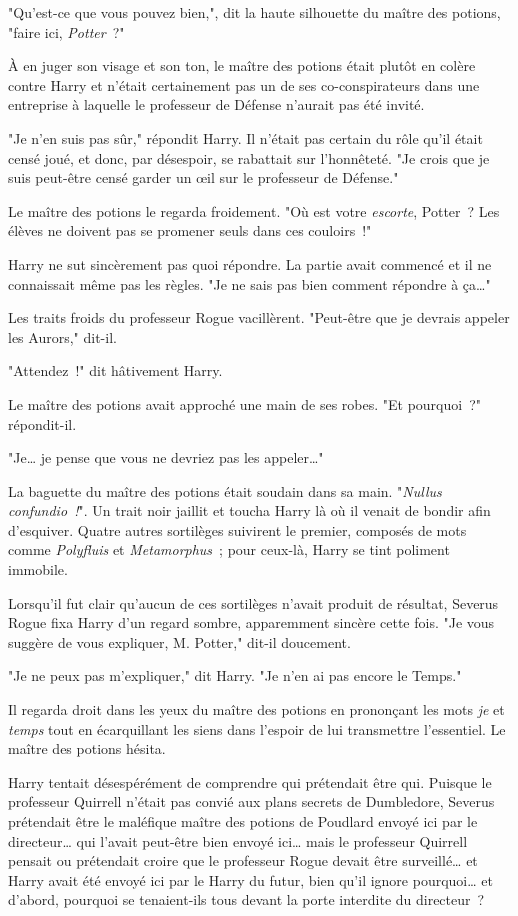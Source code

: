 "Qu'est-ce que vous pouvez bien,", dit la haute silhouette du maître des potions, "faire ici, \emph{Potter}~?"

À en juger son visage et son ton, le maître des potions était plutôt en colère contre Harry et n'était certainement pas un de ses co-conspirateurs dans une entreprise à laquelle le professeur de Défense n'aurait pas été invité.

"Je n'en suis pas sûr," répondit Harry. Il n'était pas certain du rôle qu'il était censé joué, et donc, par désespoir, se rabattait sur l'honnêteté. "Je crois que je suis peut-être censé garder un œil sur le professeur de Défense."

Le maître des potions le regarda froidement. "Où est votre \emph{escorte}, Potter~? Les élèves ne doivent pas se promener seuls dans ces couloirs~!"

Harry ne sut sincèrement pas quoi répondre. La partie avait commencé et il ne connaissait même pas les règles. "Je ne sais pas bien comment répondre à ça…"

Les traits froids du professeur Rogue vacillèrent. "Peut-être que je devrais appeler les Aurors," dit-il.

"Attendez~!" dit hâtivement Harry.

Le maître des potions avait approché une main de ses robes. "Et pourquoi~?" répondit-il.

"Je… je pense que vous ne devriez pas les appeler…"

La baguette du maître des potions était soudain dans sa main. "\emph{Nullus confundio~!}". Un trait noir jaillit et toucha Harry là où il venait de bondir afin d'esquiver. Quatre autres sortilèges suivirent le premier, composés de mots comme \emph{Polyfluis} et \emph{Metamorphus}~; pour ceux-là, Harry se tint poliment immobile.

Lorsqu'il fut clair qu'aucun de ces sortilèges n'avait produit de résultat, Severus Rogue fixa Harry d'un regard sombre, apparemment sincère cette fois. "Je vous suggère de vous expliquer, M. Potter," dit-il doucement.

"Je ne peux pas m'expliquer," dit Harry. "Je n'en ai pas encore le Temps."

Il regarda droit dans les yeux du maître des potions en prononçant les mots \emph{je} et \emph{temps} tout en écarquillant les siens dans l'espoir de lui transmettre l'essentiel. Le maître des potions hésita.

Harry tentait désespérément de comprendre qui prétendait être qui. Puisque le professeur Quirrell n'était pas convié aux plans secrets de Dumbledore, Severus prétendait être le maléfique maître des potions de Poudlard envoyé ici par le directeur… qui l'avait peut-être bien envoyé ici… mais le professeur Quirrell pensait ou prétendait croire que le professeur Rogue devait être surveillé… et Harry avait été envoyé ici par le Harry du futur, bien qu'il ignore pourquoi… et d'abord, pourquoi se tenaient-ils tous devant la porte interdite du directeur~?

